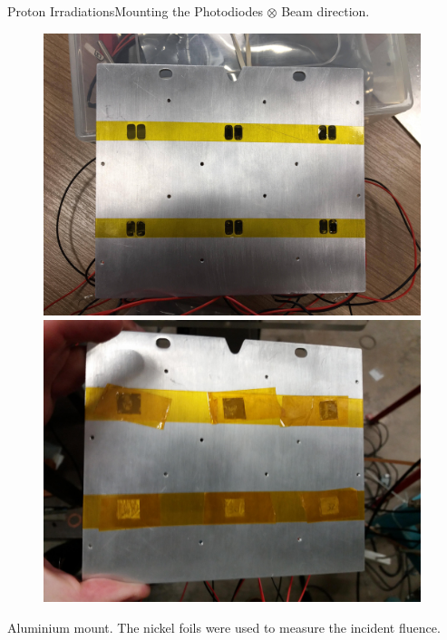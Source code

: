 \documentclass{beamer}
\begin{document}
    \begin{frame}{Proton Irradiations}{Mounting the Photodiodes}
        \centering
        $\otimes$ Beam direction.
        \begin{figure}
            \begin{minipage}[b]{0.5\linewidth}
            \centering
            \includegraphics[width = 0.98\textwidth]{Mount_no_Foils.jpg}
        \end{minipage}%
        \begin{minipage}[b]{0.5\linewidth}
            \centering
            \includegraphics[width = 0.98\textwidth]{Mount_with_Foils.jpg}
        \end{minipage}
        \end{figure}
        \centering
        Aluminium mount. The nickel foils were used to measure the incident fluence.
    \end{frame}
\end{document}
